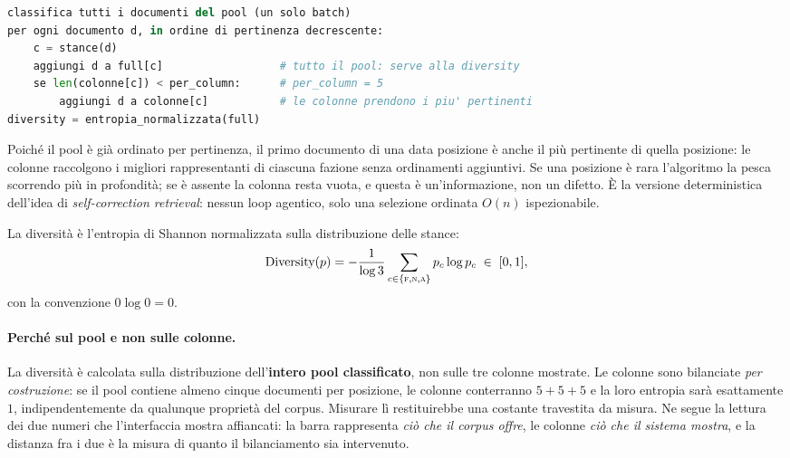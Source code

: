 \documentclass[11pt,a4paper]{report}
\begin{document}
\begin{lstlisting}[language=Python]
classifica tutti i documenti del pool (un solo batch)
per ogni documento d, in ordine di pertinenza decrescente:
    c = stance(d)
    aggiungi d a full[c]                  # tutto il pool: serve alla diversity
    se len(colonne[c]) < per_column:      # per_column = 5
        aggiungi d a colonne[c]           # le colonne prendono i piu' pertinenti
diversity = entropia_normalizzata(full)
\end{lstlisting}

Poiché il pool è già ordinato per pertinenza, il primo documento di una data posizione è anche il
più pertinente di quella posizione: le colonne raccolgono i migliori rappresentanti di ciascuna
fazione senza ordinamenti aggiuntivi. Se una posizione è rara l'algoritmo la pesca scorrendo più
in profondità; se è assente la colonna resta vuota, e questa è un'informazione, non un difetto.
È la versione deterministica dell'idea di \emph{self-correction retrieval}: nessun loop agentico,
solo una selezione ordinata $O(n)$ ispezionabile.

La diversità è l'entropia di Shannon normalizzata sulla distribuzione delle stance:
\begin{equation}\label{eq:diversity}
\text{Diversity}(p) = -\frac{1}{\log 3}\sum_{c \in \{\textsc{f},\textsc{n},\textsc{a}\}}
p_c \log p_c \;\in\; [0,1],
\end{equation}
con la convenzione $0\log 0 = 0$.

\paragraph{Perché sul pool e non sulle colonne.} La diversità è calcolata sulla distribuzione
dell'\textbf{intero pool classificato}, non sulle tre colonne mostrate. Le colonne sono
bilanciate \emph{per costruzione}: se il pool contiene almeno cinque documenti per posizione, le
colonne conterranno $5{+}5{+}5$ e la loro entropia sarà esattamente $1$, indipendentemente da
qualunque proprietà del corpus. Misurare lì restituirebbe una costante travestita da misura. Ne
segue la lettura dei due numeri che l'interfaccia mostra affiancati: la barra rappresenta
\emph{ciò che il corpus offre}, le colonne \emph{ciò che il sistema mostra}, e la distanza fra i
due è la misura di quanto il bilanciamento sia intervenuto.
\end{document}
